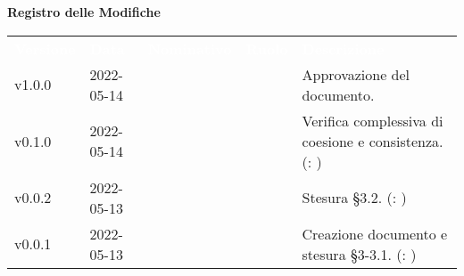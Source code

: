 

{\LARGE{\textbf{Registro delle Modifiche}}} \\
\begin{table}[!htbp]
\renewcommand{\arraystretch}{1.5}
\begin{tabular}{ m{}<{\centering}  m{}<{\centering}  m{}<{\centering}  m{}<{\centering}  m{}<{\centering} }
	\rowcolor{darkblue}
	\textcolor{white}{\textbf{Versione}} &\textcolor{white}{\textbf{Data}}& \textcolor{white}{\textbf{Nominativo}} & \textcolor{white}{\textbf{Ruolo}}&\textcolor{white}{\textbf{Descrizione}}\\ 

	v1.0.0 & 2022-05-14 & \FP & \RE & Approvazione del documento. \\

	v0.1.0& 2022-05-14 & \MB & \AN & Verifica complessiva di coesione e consistenza.  (\VE: \textit{\MG})\\
	
	v0.0.2& 2022-05-13 & \MB & \AN & Stesura \S{3.2}.  (\VE: \textit{\MG})\\

	v0.0.1& 2022-05-13 & \GC & \AN & Creazione documento e stesura \S{3-3.1}.  (\VE: \textit{\MG})\\
	
	
\end{tabular}
\end{table}

\pagebreak